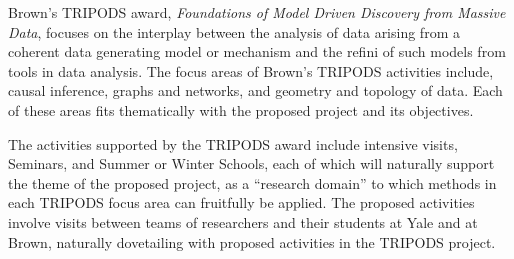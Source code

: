 
Brown's TRIPODS award, \emph{Foundations of Model Driven Discovery from Massive Data}, focuses on the interplay between the analysis of data arising from a coherent data generating model or mechanism and the refini of such models from tools in data analysis. The focus areas of Brown's TRIPODS activities include, causal inference, graphs and networks, and geometry and topology of data. Each of these areas fits thematically with the proposed project and its objectives.

The activities supported by the TRIPODS award include intensive visits, Seminars, and Summer or Winter Schools, each of which will naturally support the theme of the proposed project, as a ``research domain'' to which methods in each TRIPODS focus area can fruitfully be applied. The proposed activities involve visits between teams of researchers and their students at Yale and at Brown, naturally dovetailing with proposed activities in the TRIPODS project. 